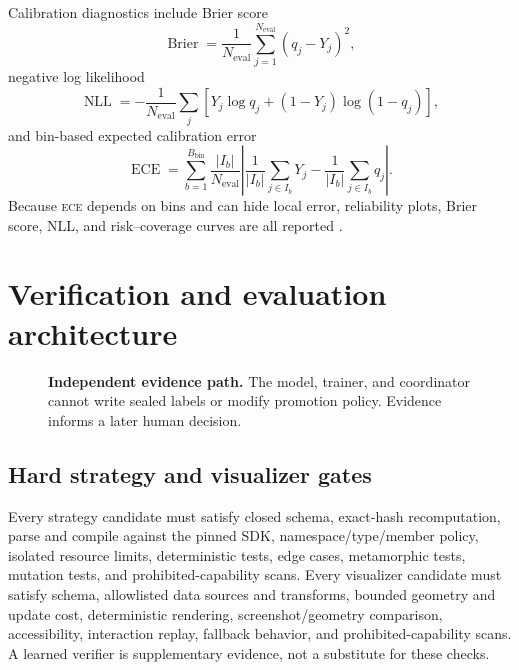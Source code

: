 \documentclass[10pt,letterpaper]{article}
\newcommand{\abbr}[1]{\textsc{\MakeLowercase{#1}}}
\newcommand{\1}{\mathbb{1}}
\newcommand{\NLL}{\operatorname{NLL}}
\newcommand{\ECE}{\operatorname{ECE}}
\begin{document}
Calibration diagnostics include Brier score
\begin{equation}
  \operatorname{Brier}=\frac{1}{N_{\mathrm{eval}}}
  \sum_{j=1}^{N_{\mathrm{eval}}}(q_j-Y_j)^2,
  \label{eq:brier}
\end{equation}
negative log likelihood
\begin{equation}
  \NLL=-\frac{1}{N_{\mathrm{eval}}}\sum_j
  \left[Y_j\log q_j+(1-Y_j)\log(1-q_j)\right],
  \label{eq:calibration-nll}
\end{equation}
and bin-based expected calibration error
\begin{equation}
  \ECE=\sum_{b=1}^{B_{\mathrm{bin}}}
  \frac{|I_b|}{N_{\mathrm{eval}}}
  \left|\frac{1}{|I_b|}\sum_{j\in I_b}Y_j
       -\frac{1}{|I_b|}\sum_{j\in I_b}q_j\right|.
  \label{eq:ece}
\end{equation}
Because \abbr{ECE} depends on bins and can hide local error, reliability plots, Brier score, NLL, and
risk--coverage curves are all reported \cite{kadavath2022calibration}.

\section{Verification and evaluation architecture}

\begin{figure}[t]
  \centering
  \resizebox{\linewidth}{!}{}
  \caption{\textbf{Independent evidence path.}  The model, trainer, and coordinator cannot write
  sealed labels or modify promotion policy.  Evidence informs a later human decision.}
  \label{fig:evaluation}
\end{figure}

\subsection{Hard strategy and visualizer gates}

Every strategy candidate must satisfy closed schema, exact-hash recomputation, parse and compile
against the pinned SDK, namespace/type/member policy, isolated resource limits, deterministic tests,
edge cases, metamorphic tests, mutation tests, and prohibited-capability scans.  Every visualizer
candidate must satisfy schema, allowlisted data sources and transforms, bounded geometry and update
cost, deterministic rendering, screenshot/geometry comparison, accessibility, interaction replay,
fallback behavior, and prohibited-capability scans.  A learned verifier is supplementary evidence,
not a substitute for these checks.
\end{document}
